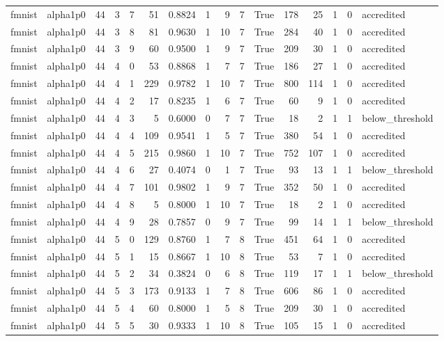 \begin{tabular}{llrrrrrrrrrrrrrl}
fmnist & alpha1p0 & 44 & 3 & 7 & 51 & 0.8824 & 1 & 9 & 7 & True & 178 & 25 & 1 & 0 & accredited \\
fmnist & alpha1p0 & 44 & 3 & 8 & 81 & 0.9630 & 1 & 10 & 7 & True & 284 & 40 & 1 & 0 & accredited \\
fmnist & alpha1p0 & 44 & 3 & 9 & 60 & 0.9500 & 1 & 9 & 7 & True & 209 & 30 & 1 & 0 & accredited \\
fmnist & alpha1p0 & 44 & 4 & 0 & 53 & 0.8868 & 1 & 7 & 7 & True & 186 & 27 & 1 & 0 & accredited \\
fmnist & alpha1p0 & 44 & 4 & 1 & 229 & 0.9782 & 1 & 10 & 7 & True & 800 & 114 & 1 & 0 & accredited \\
fmnist & alpha1p0 & 44 & 4 & 2 & 17 & 0.8235 & 1 & 6 & 7 & True & 60 & 9 & 1 & 0 & accredited \\
fmnist & alpha1p0 & 44 & 4 & 3 & 5 & 0.6000 & 0 & 7 & 7 & True & 18 & 2 & 1 & 1 & below\_threshold \\
fmnist & alpha1p0 & 44 & 4 & 4 & 109 & 0.9541 & 1 & 5 & 7 & True & 380 & 54 & 1 & 0 & accredited \\
fmnist & alpha1p0 & 44 & 4 & 5 & 215 & 0.9860 & 1 & 10 & 7 & True & 752 & 107 & 1 & 0 & accredited \\
fmnist & alpha1p0 & 44 & 4 & 6 & 27 & 0.4074 & 0 & 1 & 7 & True & 93 & 13 & 1 & 1 & below\_threshold \\
fmnist & alpha1p0 & 44 & 4 & 7 & 101 & 0.9802 & 1 & 9 & 7 & True & 352 & 50 & 1 & 0 & accredited \\
fmnist & alpha1p0 & 44 & 4 & 8 & 5 & 0.8000 & 1 & 10 & 7 & True & 18 & 2 & 1 & 0 & accredited \\
fmnist & alpha1p0 & 44 & 4 & 9 & 28 & 0.7857 & 0 & 9 & 7 & True & 99 & 14 & 1 & 1 & below\_threshold \\
fmnist & alpha1p0 & 44 & 5 & 0 & 129 & 0.8760 & 1 & 7 & 8 & True & 451 & 64 & 1 & 0 & accredited \\
fmnist & alpha1p0 & 44 & 5 & 1 & 15 & 0.8667 & 1 & 10 & 8 & True & 53 & 7 & 1 & 0 & accredited \\
fmnist & alpha1p0 & 44 & 5 & 2 & 34 & 0.3824 & 0 & 6 & 8 & True & 119 & 17 & 1 & 1 & below\_threshold \\
fmnist & alpha1p0 & 44 & 5 & 3 & 173 & 0.9133 & 1 & 7 & 8 & True & 606 & 86 & 1 & 0 & accredited \\
fmnist & alpha1p0 & 44 & 5 & 4 & 60 & 0.8000 & 1 & 5 & 8 & True & 209 & 30 & 1 & 0 & accredited \\
fmnist & alpha1p0 & 44 & 5 & 5 & 30 & 0.9333 & 1 & 10 & 8 & True & 105 & 15 & 1 & 0 & accredited \\

\end{tabular}
